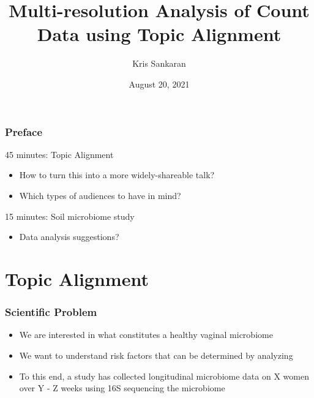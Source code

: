 \documentclass{beamer}
\title{Multi-resolution Analysis of Count Data using Topic Alignment}
\author{Kris Sankaran}
\date{August 20, 2021}
\begin{document}
\frame{\titlepage}

\begin{frame}
  \frametitle{Preface}

  45 minutes: Topic Alignment
  \begin{itemize}
    \item How to turn this into a more widely-shareable talk?
    \item Which types of audiences to have in mind?
  \end{itemize}

  15 minutes: Soil microbiome study
  \begin{itemize}
  \item Data analysis suggestions?
  \end{itemize}
\end{frame}

\section{Topic Alignment}

\begin{frame}
  \frametitle{Scientific Problem}
  \begin{itemize}
  \item We are interested in what constitutes a healthy vaginal microbiome
  \item We want to understand risk factors that can be determined by analyzing
  \item To this end, a study has collected longitudinal microbiome data on X
  women over Y - Z weeks using 16S sequencing
  the microbiome
\end{itemize}
\end{frame}
\end{document}
